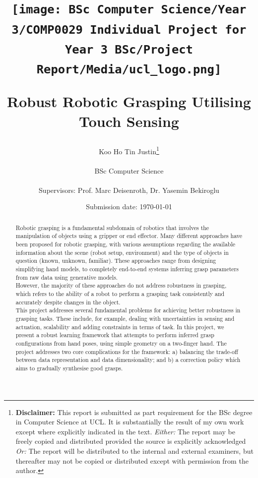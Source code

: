 \documentclass[12pt, a4paper]{report}
\title{{\vspace{-2in}\texttt{[image: BSc Computer Science/Year 3/COMP0029 Individual Project for Year 3 BSc/Project Report/Media/ucl\_logo.png]}}\\
\vspace{2cm}
\begin{adjustwidth}{1cm}{1cm}
    \centering
    \Huge Robust Robotic Grasping Utilising Touch Sensing
\end{adjustwidth}}
\date{Submission date: \today}
\author{Koo Ho Tin Justin\thanks{
{\bf Disclaimer:}
This report is submitted as part requirement for the BSc degree in Computer Science at UCL. It is
substantially the result of my own work except where explicitly indicated in the text.
\emph{Either:} The report may be freely copied and distributed provided the source is explicitly acknowledged
\newline  %
\emph{Or:}\newline
The report will be distributed to the internal and external examiners, but thereafter may not be copied or distributed except with permission from the author.}
\\ \\
BSc Computer Science\\ \\
Supervisors: Prof. Marc Deisenroth, Dr. Yasemin Bekiroglu}
\theoremstyle{definition}
\begin{document}
\onehalfspacing
\maketitle


\begin{abstract}
Robotic grasping is a fundamental subdomain of robotics that involves the manipulation of objects using a gripper or end effector. Many different approaches have been proposed for robotic grasping, with various assumptions regarding the available information about the scene (robot setup, environment) and the type of objects in question (known, unknown, familiar). These approaches range from designing simplifying hand models, to completely end-to-end systems inferring grasp parameters from raw data using generative models.\\

However, the majority of these approaches do not address robustness in grasping, which refers to the ability of a robot to perform a grasping task consistently and accurately despite changes in the object.\\

This project addresses several fundamental problems for achieving better robustness in grasping tasks. These include, for example, dealing with uncertainties in sensing and actuation, scalability and adding constraints in terms of task. In this project, we present a robust learning framework that attempts to perform inferred grasp configurations from hand poses, using simple geometry on a two-finger hand. The project addresses two core complications for the framework: a) balancing the trade-off between data representation and data dimensionality; and b) a correction policy which aims to gradually synthesise good grasps.
\end{abstract}


\renewcommand\abstractname{Acknowledgments}
\begin{abstract}
    
\end{abstract}


\tableofcontents
\setcounter{page}{1}
\end{document}
